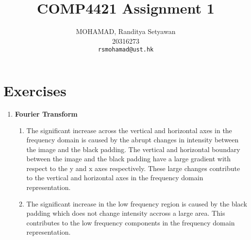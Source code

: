 \documentclass[12pt,a4paper]{article}
\title{COMP4421 Assignment 1}
\author{MOHAMAD, Randitya Setyawan\\20316273\\ \texttt{rsmohamad@ust.hk}}
\begin{document}
	\maketitle
	
	\section{Exercises}
	\begin{enumerate}
		\item \textbf{Fourier Transform}
		\begin{enumerate}
			\item The significant increase across the vertical and horizontal axes in the frequency domain is caused by the abrupt changes in intensity between the image and the black padding. The vertical and horizontal boundary between the image and the black padding have a large gradient with respect to the y and x axes respectively. These large changes contribute to the vertical and horizontal axes in the frequency domain representation.
			\item The significant increase in the low frequency region is caused by the black padding which does not change intensity accross a large area. This contributes to the low frequency components in the frequency domain representation.
		\end{enumerate}
	\end{enumerate}
\end{document}
